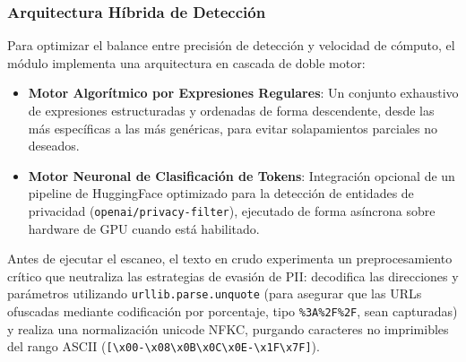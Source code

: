 \subsubsection{Arquitectura Híbrida de Detección}
Para optimizar el balance entre precisión de detección y velocidad de cómputo, el módulo implementa una arquitectura en cascada de doble motor:
\begin{itemize}
    \item \textbf{Motor Algorítmico por Expresiones Regulares}: Un conjunto exhaustivo de expresiones estructuradas y ordenadas de forma descendente, desde las más específicas a las más genéricas, para evitar solapamientos parciales no deseados.
    \item \textbf{Motor Neuronal de Clasificación de Tokens}: Integración opcional de un pipeline de HuggingFace optimizado para la detección de entidades de privacidad (\texttt{openai/privacy-filter}), ejecutado de forma asíncrona sobre hardware de GPU cuando está habilitado.
\end{itemize}

Antes de ejecutar el escaneo, el texto en crudo experimenta un preprocesamiento crítico que neutraliza las estrategias de evasión de PII: decodifica las direcciones y parámetros utilizando \texttt{urllib.parse.unquote} (para asegurar que las URLs ofuscadas mediante codificación por porcentaje, tipo \texttt{\%3A\%2F\%2F}, sean capturadas) y realiza una normalización unicode NFKC, purgando caracteres no imprimibles del rango ASCII (\texttt{[\textbackslash x00-\textbackslash x08\textbackslash x0B\textbackslash x0C\textbackslash x0E-\textbackslash x1F\textbackslash x7F]}).

